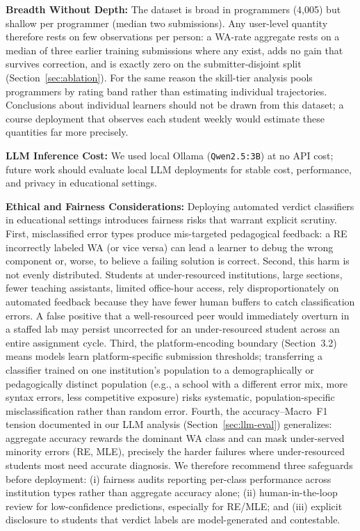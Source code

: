 \documentclass[acmsmall]{acmart}
\begin{document}
\textbf{Breadth Without Depth:} The dataset is broad in programmers (4,005) but
shallow per programmer (median two submissions). Any user-level quantity
therefore rests on few observations per person: a WA-rate aggregate rests on a
median of three earlier training submissions where any exist, adds no gain that
survives correction, and is exactly zero on the submitter-disjoint split
(Section~\ref{sec:ablation}). For the same reason the
skill-tier analysis pools programmers by rating band rather than estimating
individual trajectories.
Conclusions about individual learners should not be drawn from this dataset; a
course deployment that observes each student weekly would estimate these
quantities far more precisely.

\textbf{LLM Inference Cost:} We used local Ollama (\texttt{Qwen2.5:3B}) at no
API cost; future work should evaluate local LLM deployments for stable cost,
performance, and privacy in educational settings.

\textbf{Ethical and Fairness Considerations:} Deploying automated verdict
classifiers in educational settings introduces fairness risks that warrant
explicit scrutiny. First, misclassified error types produce mis-targeted
pedagogical feedback: a RE incorrectly labeled WA (or vice versa) can lead a
learner to debug the wrong component or, worse, to believe a failing solution
is correct. Second, this harm is not evenly distributed. Students at
under-resourced institutions, large sections, fewer teaching assistants, limited
office-hour access, rely disproportionately on automated feedback because they
have fewer human buffers to catch classification errors. A false positive that a
well-resourced peer would immediately overturn in a staffed lab may persist
uncorrected for an under-resourced student across an entire assignment cycle.
Third, the platform-encoding boundary (Section~3.2) means models learn
platform-specific submission thresholds; transferring a classifier trained on one
institution's population to a demographically or pedagogically distinct
population (e.g., a school with a different error mix, more syntax errors, less
competitive exposure) risks systematic, population-specific misclassification
rather than random error. Fourth, the accuracy--Macro~F1 tension documented in
our LLM analysis (Section~\ref{sec:llm-eval}) generalizes: aggregate accuracy rewards the
dominant WA class and can mask under-served minority errors (RE, MLE), precisely
the harder failures where under-resourced students most need accurate diagnosis.
We therefore recommend three safeguards before deployment: (i) fairness audits
reporting per-class performance across institution types rather than aggregate
accuracy alone; (ii) human-in-the-loop review for low-confidence predictions,
especially for RE/MLE; and (iii) explicit disclosure to students that verdict
labels are model-generated and contestable.
\end{document}
